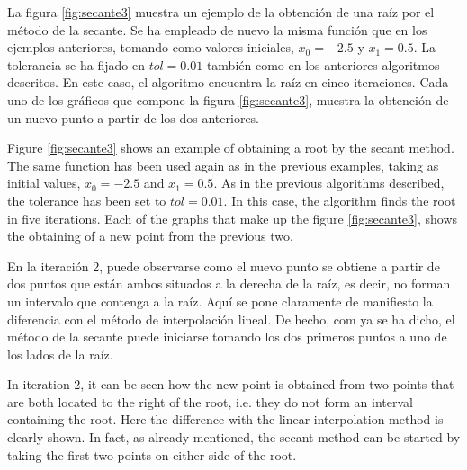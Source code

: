 %

\begin{paracol}{2}
La figura \ref{fig:secante3} muestra un ejemplo de la obtención de una raíz por el método de la secante. Se ha empleado de nuevo la misma función que en los ejemplos anteriores, tomando como valores iniciales, $x_0=-2.5$ y $x_1=0.5$. La tolerancia se ha fijado en $tol=0.01$ también como en los anteriores algoritmos descritos. En este caso, el algoritmo encuentra la raíz en cinco iteraciones. Cada uno de los gráficos que compone la figura \ref{fig:secante3}, muestra la obtención de un nuevo punto a partir de los dos anteriores. 

    \switchcolumn
Figure \ref{fig:secante3} shows an example of obtaining a root by the secant method. The same function has been used again as in the previous examples, taking as initial values, $x_0=-2.5$ and $x_1=0.5$. As in the previous algorithms described, the tolerance has been set to $tol=0.01$. In this case, the algorithm finds the root in five iterations. Each of the graphs that make up the figure \ref{fig:secante3}, shows the obtaining of a new point from the previous two. 
    \switchcolumn

En la iteración 2, puede observarse como el nuevo punto se obtiene a partir de dos puntos que están ambos situados a la derecha de la raíz, es decir, no forman un intervalo que contenga a la raíz.  Aquí se pone claramente de manifiesto la diferencia con el método de interpolación lineal. De hecho, com ya se ha dicho, el método de la secante puede iniciarse tomando los dos primeros puntos a uno de los lados de la raíz.

\switchcolumn
In iteration 2, it can be seen how the new point is obtained from two points that are both located to the right of the root, i.e. they do not form an interval containing the root.  Here the difference with the linear interpolation method is clearly shown. In fact, as already mentioned, the secant method can be started by taking the first two points on either side of the root.


\end{paracol}

